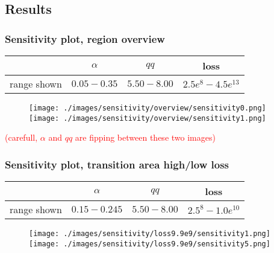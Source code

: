 \documentclass{beamer}
\begin{document}
\subsection{Results}
\begin{frame}
	\frametitle{Sensitivity plot, region overview}
	\begin{center}
		\begin{tabular}{|c|c|c|c|}
			\hline & $\alpha$ & $qq$ & loss \\
			\hline range shown & $0.05-0.35$ & $5.50-8.00$ & $2.5e^{8}-4.5e^{13}$\\
			\hline
		\end{tabular}
		\begin{figure}
				\hspace{-1.3cm}
				\texttt{[image: ./images/sensitivity/overview/sensitivity0.png]}\hspace{-1.0cm}%
				\texttt{[image: ./images/sensitivity/overview/sensitivity1.png]}
		\end{figure}
		\textcolor{red}{(carefull, $\alpha$ and $qq$ are fipping between these two images)}
	\end{center}
\end{frame}

\begin{frame}
	\frametitle{Sensitivity plot, transition area high/low loss}
	\begin{center}
		\begin{tabular}{|c|c|c|c|}
			\hline & $\alpha$ & $qq$ & loss \\
			\hline range shown & $0.15-0.245$ & $5.50-8.00$ & $2.5^{8}-1.0e^{10}$\\
			\hline
		\end{tabular}

		\begin{figure}[htbp]
				\hspace{-1.4cm}
				\texttt{[image: ./images/sensitivity/loss9.9e9/sensitivity1.png]}\hspace{-1.0cm} %
				\texttt{[image: ./images/sensitivity/loss9.9e9/sensitivity5.png]}
		\end{figure}
	\end{center}
\end{frame}
\end{document}
